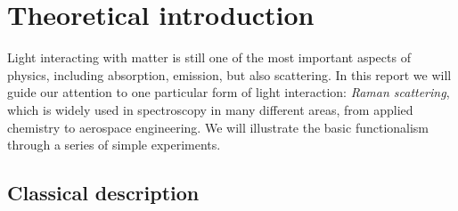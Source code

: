 \section{Theoretical introduction}
Light interacting with matter is still one of the most important aspects of physics, including
absorption, emission, but also scattering. In this report we will guide our attention to one
particular form of light interaction: \textit{Raman scattering}, which is widely used in spectroscopy
in many different areas, from applied chemistry to aerospace engineering. We will illustrate the 
basic functionalism through a series of simple experiments.

\subsection{Classical description}
\label{sub:classical_description}

